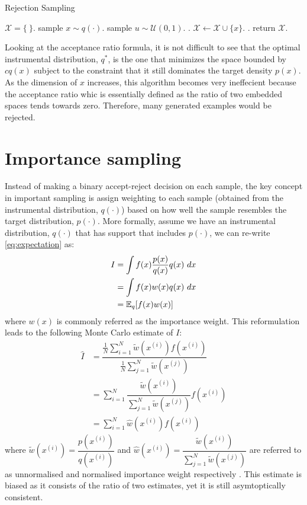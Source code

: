 \begin{algorithm}
\caption{Rejection Sampling}\label{algo:rejectionsampling}
\begin{algorithmic}[1]
\State $\mathcal{X} = \{\ \}$.
\Repeat
  \State sample $x \sim q(\cdot)$.
  \State sample $u \sim \mathcal{U}(0,1)$.
  .
    \State $\mathcal{X} \gets \mathcal{X} \cup \{x\}$.
  \EndIf
{}.
\State return $\mathcal{X}$.
\EndFunction
\end{algorithmic}
\end{algorithm}

Looking at the acceptance ratio formula, it is not difficult to see that the optimal instrumental distribution, $q^*$, is the one that minimizes the space bounded by $cq(x)$ subject to the constraint that it still dominates the target density $p(x)$. As the dimension of $x$ increases, this algorithm becomes very ineffecient because the acceptance ratio whic is essentially defined as the ratio of two embedded spaces tends towards zero. Therefore, many generated examples would be rejected. 

\section{Importance sampling}
\label{sec:IS}
Instead of making a binary accept-reject decision on each sample, the key concept in important sampling is assign weighting to each sample (obtained from the instrumental distribution, $q(\cdot)$) based on how well the sample resembles the target distribution, $p(\cdot)$. More formally, assume we have an instrumental distribution, $q(\cdot)$ that has support that includes $p(\cdot)$, we can re-write \eqref{eq:expectation} as:
\begin{align}
  I &= \int f(x)\dfrac{p(x)}{q(x)}q(x)~dx \nonumber \\
    &= \int f(x)w(x)q(x)~dx \nonumber \\
    &= \operatorname{\mathbb{E}}_q[f(x)w(x)]
\end{align}
where $w(x)$ is commonly referred as the importance weight. This reformulation leads to the following Monte Carlo estimate of $I$:
\begin{align}
  \hat{I} &= \dfrac{\frac{1}{N} \sum^N_{i=1} \tilde{w}(x^{(i)})f(x^{(i)})}{\frac{1}{N} \sum^N_{j=1} \tilde{w}(x^{(j)})} \nonumber \\ 
          &= \sum^N_{i=1} \dfrac{\tilde{w}(x^{(i)})}{\sum^N_{j=1} \tilde{w}(x^{(j)})} f(x^{(i)}) \nonumber \\
          &= \sum^N_{i=1} \hat{w}(x^{(i)}) f(x^{(i)})  \label{eq:is} 
\end{align}
where $\tilde{w}(x^{(i)}) = \dfrac{p(x^{(i)})}{q(x^{(i)})}$ and $\hat{w}(x^{(i)})  = \dfrac{\tilde{w}(x^{(i)})}{\sum^N_{j=1} \tilde{w}(x^{(j)})}$ are referred to as unnormalised and normalised importance weight respectively \cite{CO05}. This estimate is biased as it consists of the ratio of two estimates, yet it is still asymtoptically consistent.

